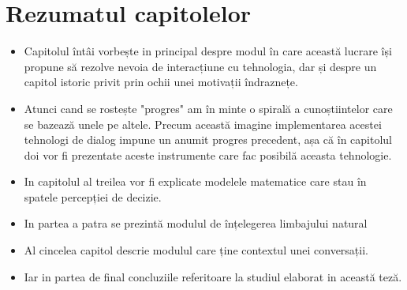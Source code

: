 \section{Rezumatul capitolelor}

\begin{itemize}
	\item 
	Capitolul întâi vorbește in principal despre modul în care această lucrare își propune să rezolve nevoia de interacțiune cu tehnologia, dar și despre un capitol istoric privit prin ochii unei motivații îndraznețe.
	\item
	Atunci cand se rostește "progres" am în minte o  spirală a cunoștiintelor care se bazează unele pe altele. Precum această imagine implementarea acestei tehnologi de dialog impune un anumit progres precedent, așa că în capitolul doi vor fi prezentate aceste instrumente care fac posibilă aceasta tehnologie.
	\item
	In capitolul al treilea vor fi explicate modelele matematice care stau în spatele percepției de decizie.
	\item
	In partea a patra se prezintă modulul de înțelegerea limbajului natural
	\item
	Al cincelea capitol descrie modulul care ține contextul unei conversații.
	\item
	Iar in partea de final concluziile referitoare la studiul elaborat in această teză.
\end{itemize}

